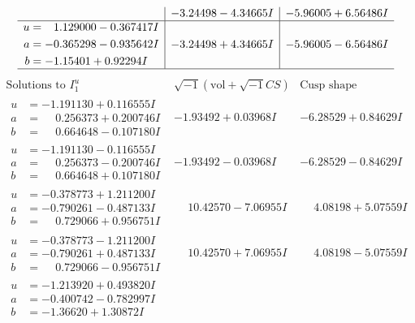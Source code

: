 \documentclass[1p]{elsarticle_modified}
\theoremstyle{definition}
\newcommand{\I}{\sqrt{-1}}
\begin{document}
$$\begin{array}{c|c|c}
 & -3.24498 - 4.34665 I & -5.96005 + 6.56486 I \\ \hline\begin{aligned}
u &= \phantom{-}1.129000 - 0.367417 I \\
a &= -0.365298 - 0.935642 I \\
b &= -1.15401 + 0.92294 I\end{aligned}
 & -3.24498 + 4.34665 I & -5.96005 - 6.56486 I\\
 \hline 
 \end{array}$$\newpage$$\begin{array}{c|c|c}  
\text{Solutions to }I^u_{1}& \I (\text{vol} + \sqrt{-1}CS) & \text{Cusp shape}\\
 \hline 
\begin{aligned}
u &= -1.191130 + 0.116555 I \\
a &= \phantom{-}0.256373 + 0.200746 I \\
b &= \phantom{-}0.664648 - 0.107180 I\end{aligned}
 & -1.93492 + 0.03968 I & -6.28529 + 0.84629 I \\ \hline\begin{aligned}
u &= -1.191130 - 0.116555 I \\
a &= \phantom{-}0.256373 - 0.200746 I \\
b &= \phantom{-}0.664648 + 0.107180 I\end{aligned}
 & -1.93492 - 0.03968 I & -6.28529 - 0.84629 I \\ \hline\begin{aligned}
u &= -0.378773 + 1.211200 I \\
a &= -0.790261 - 0.487133 I \\
b &= \phantom{-}0.729066 + 0.956751 I\end{aligned}
 & \phantom{-}10.42570 - 7.06955 I & \phantom{-}4.08198 + 5.07559 I \\ \hline\begin{aligned}
u &= -0.378773 - 1.211200 I \\
a &= -0.790261 + 0.487133 I \\
b &= \phantom{-}0.729066 - 0.956751 I\end{aligned}
 & \phantom{-}10.42570 + 7.06955 I & \phantom{-}4.08198 - 5.07559 I \\ \hline\begin{aligned}
u &= -1.213920 + 0.493820 I \\
a &= -0.400742 - 0.782997 I \\
b &= -1.36620 + 1.30872 I\end{aligned}

\end{array}$$
\end{document}
